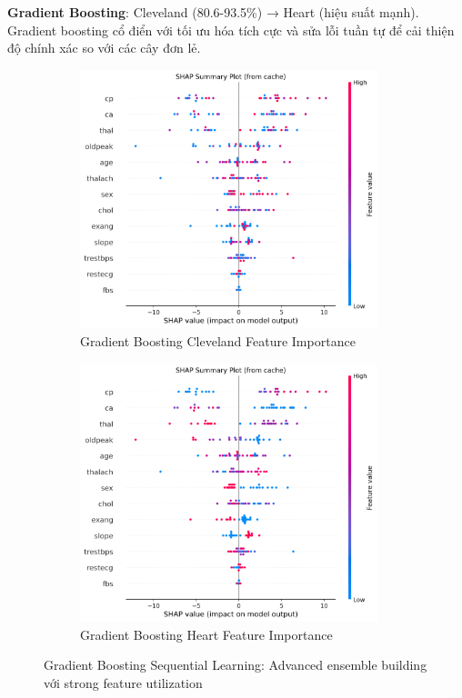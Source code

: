 \textbf{Gradient Boosting}: Cleveland (80.6-93.5\%) → Heart (hiệu suất mạnh). Gradient boosting cổ điển với tối ưu hóa tích cực và sửa lỗi tuần tự để cải thiện độ chính xác so với các cây đơn lẻ.

\begin{figure}[H]
\centering
\begin{subfigure}[b]{0.48\textwidth}
\centering
\includegraphics[width=0.95\textwidth]{Result/cleveland_dataset/GB/SHAP/Summary.png}
\caption{Gradient Boosting Cleveland Feature Importance}
\label{fig:gb_shap_cleveland_analysis}
\end{subfigure}
\hfill
\begin{subfigure}[b]{0.48\textwidth}
\centering
\includegraphics[width=0.95\textwidth]{Result/heart_dataset/GB/SHAP/Summary.png}
\caption{Gradient Boosting Heart Feature Importance}
\label{fig:gb_shap_heart_analysis}
\end{subfigure}
\caption{Gradient Boosting Sequential Learning: Advanced ensemble building với strong feature utilization}
\label{fig:gradient_boosting_complete}
\end{figure}

